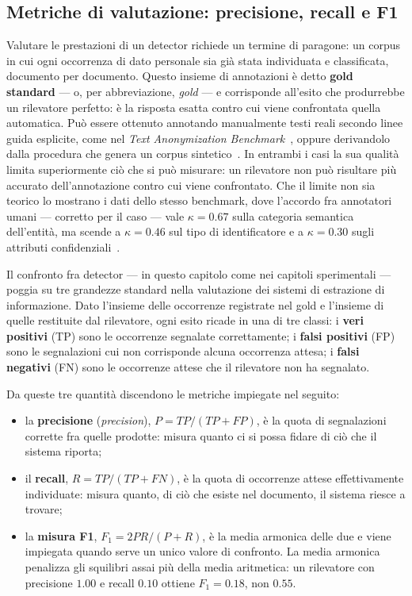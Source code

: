 \subsection{Metriche di valutazione: precisione, recall e F1}
\label{sub:metriche}
Valutare le prestazioni di un detector richiede un termine di paragone: un corpus in cui ogni occorrenza di dato personale sia già stata individuata e classificata, documento per documento. Questo insieme di annotazioni è detto \textbf{gold standard} --- o, per abbreviazione, \textit{gold} --- e corrisponde all'esito che produrrebbe un rilevatore perfetto: è la risposta esatta contro cui viene confrontata quella automatica. Può essere ottenuto annotando manualmente testi reali secondo linee guida esplicite, come nel \textit{Text Anonymization Benchmark}~\cite{pilanTextAnonymizationBenchmark2022}, oppure derivandolo dalla procedura che genera un corpus sintetico~\cite{hengProgGenGeneratingNamed2024}. In entrambi i casi la sua qualità limita superiormente ciò che si può misurare: un rilevatore non può risultare più accurato dell'annotazione contro cui viene confrontato. Che il limite non sia teorico lo mostrano i dati dello stesso benchmark, dove l'accordo fra annotatori umani --- corretto per il caso --- vale $\kappa = 0.67$ sulla categoria semantica dell'entità, ma scende a $\kappa = 0.46$ sul tipo di identificatore e a $\kappa = 0.30$ sugli attributi confidenziali~\cite{pilanTextAnonymizationBenchmark2022}. \medskip

Il confronto fra detector --- in questo capitolo come nei capitoli sperimentali --- poggia su tre grandezze standard nella valutazione dei sistemi di estrazione di informazione. Dato l'insieme delle occorrenze registrate nel gold e l'insieme di quelle restituite dal rilevatore, ogni esito ricade in una di tre classi: i \textbf{veri positivi} (TP) sono le occorrenze segnalate correttamente; i \textbf{falsi positivi} (FP) sono le segnalazioni cui non corrisponde alcuna occorrenza attesa; i \textbf{falsi negativi} (FN) sono le occorrenze attese che il rilevatore non ha segnalato. \medskip

Da queste tre quantità discendono le metriche impiegate nel seguito:
\begin{itemize}
	\item la \textbf{precisione} (\textit{precision}), $P = TP / (TP + FP)$, è la quota di segnalazioni corrette fra quelle prodotte: misura quanto ci si possa fidare di ciò che il sistema riporta;
	\item il \textbf{recall}, $R = TP / (TP + FN)$, è la quota di occorrenze attese effettivamente individuate: misura quanto, di ciò che esiste nel documento, il sistema riesce a trovare;
	\item la \textbf{misura F1}, $F_1 = 2PR / (P + R)$, è la media armonica delle due e viene impiegata quando serve un unico valore di confronto. La media armonica penalizza gli squilibri assai più della media aritmetica: un rilevatore con precisione $1.00$ e recall $0.10$ ottiene $F_1 = 0.18$, non $0.55$.
\end{itemize} \medskip

